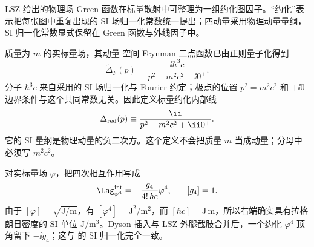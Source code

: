 
LSZ 给出的物理场 Green 函数在标量散射中可整理为一组约化图因子。“约化”表示把每张图中重复出现的 SI 场归一化常数统一提出；四动量采用物理动量量纲，SI 归一化常数显式保留在 Green 函数与外线因子中。

质量为 $m$ 的实标量场，其动量-空间 Feynman 二点函数已由正则量子化得到
\begin{equation}
 \widetilde\Delta_F(p)
 =\frac{\ii\hbar^3c}{p^2-m^2c^2+\ii0^+}.
 \label{eq:scalar-physical-propagator-common-r15}
\end{equation}
分子 $\hbar^3c$ 来自采用的 SI 场归一化与 Fourier 约定；极点的位置 $p^2=m^2c^2$ 和 $+\ii0^+$ 边界条件与这个共同常数无关。因此定义标量约化内部线
\begin{equation}
 {
 \Delta_{\rm red}(p)
 \equiv\frac{\ii}{p^2-m^2c^2+\ii0^+}.}
 \label{eq:scalar-reduced-propagator-common-r15}
\end{equation}
它的 SI 量纲是物理动量的负二次方。这个定义不会把质量 $m$ 当成动量；分母中必须写 $m^2c^2$。


对实标量场 $\varphi$，把四次相互作用写成
\begin{equation}
 {
 \Lag_{\varphi^4}^{\rm int}
 =-\frac{g_4}{4!\,\hbar c}\varphi^4,}
 \qquad [g_4]=1.
 \label{eq:phi4-si-coupling-common-r15}
\end{equation}
由于 $[\varphi]=\sqrt{\mathrm{J/m}}$，有 $[\varphi^4]=\mathrm{J^2/m^2}$，而 $[\hbar c]=\mathrm{J\,m}$，所以右端确实具有拉格朗日密度的 SI 单位 $\mathrm{J/m^3}$。Dyson 插入与 LSZ 外腿截肢合并后，一个约化 $\varphi^4$ 顶角留下 $-\ii g_4$；这与  的 SI 归一化完全一致。

